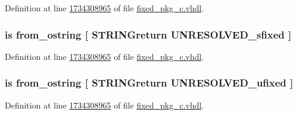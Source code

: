 Definition at line \hyperlink{fixed__pkg__c_8vhdl_source_l1734308965}{1734308965} of file \hyperlink{fixed__pkg__c_8vhdl_source}{fixed\+\_\+pkg\+\_\+c.\+vhdl}.

\hypertarget{classfixed__pkg_ad03780406d82a1039546103c01b05ab0}{}
\subsubsection[{from\+\_\+octal\+\_\+string}]{ {\bfseries \textcolor{keywordflow}{is}\textcolor{vhdlchar}{ }\textcolor{vhdlchar}{from\+\_\+ostring}\textcolor{vhdlchar}{ }\textcolor{vhdlchar}{\mbox{[}}\textcolor{vhdlchar}{ }\textcolor{vhdlchar}{S\+T\+R\+I\+N\+Greturn}\textcolor{vhdlchar}{ }{\bfseries {\bf U\+N\+R\+E\+S\+O\+L\+V\+E\+D\+\_\+sfixed}} \textcolor{vhdlchar}{ }\textcolor{vhdlchar}{\mbox{]}}\textcolor{vhdlchar}{ }} \hspace{0.3cm}{\ttfamily [Alias]}}\label{classfixed__pkg_ad03780406d82a1039546103c01b05ab0}


Definition at line \hyperlink{fixed__pkg__c_8vhdl_source_l1734308965}{1734308965} of file \hyperlink{fixed__pkg__c_8vhdl_source}{fixed\+\_\+pkg\+\_\+c.\+vhdl}.

\hypertarget{classfixed__pkg_a2b0895c85462ecb81aa58edb01967ec6}{}
\subsubsection[{from\+\_\+octal\+\_\+string}]{ {\bfseries \textcolor{keywordflow}{is}\textcolor{vhdlchar}{ }\textcolor{vhdlchar}{from\+\_\+ostring}\textcolor{vhdlchar}{ }\textcolor{vhdlchar}{\mbox{[}}\textcolor{vhdlchar}{ }\textcolor{vhdlchar}{S\+T\+R\+I\+N\+Greturn}\textcolor{vhdlchar}{ }{\bfseries {\bf U\+N\+R\+E\+S\+O\+L\+V\+E\+D\+\_\+ufixed}} \textcolor{vhdlchar}{ }\textcolor{vhdlchar}{\mbox{]}}\textcolor{vhdlchar}{ }} \hspace{0.3cm}{\ttfamily [Alias]}}\label{classfixed__pkg_a2b0895c85462ecb81aa58edb01967ec6}


Definition at line \hyperlink{fixed__pkg__c_8vhdl_source_l1734308965}{1734308965} of file \hyperlink{fixed__pkg__c_8vhdl_source}{fixed\+\_\+pkg\+\_\+c.\+vhdl}.

